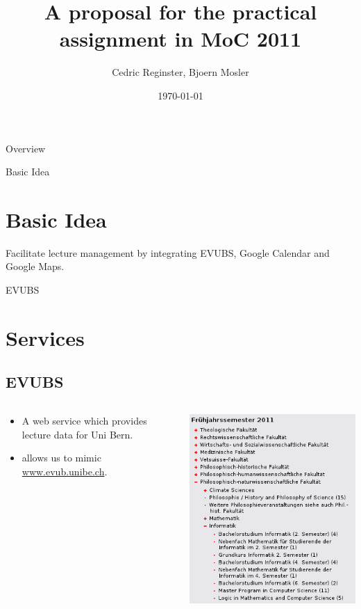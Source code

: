 \documentclass{beamer}
\title[Integrated Lecture Management]{A proposal for the practical assignment in MoC 2011}
\date{\today}
\institute{IAM}
\author{Cedric Reginster, Bjoern Mosler}
\begin{document}
\begin{frame}
	\titlepage
\end{frame}


\begin{frame}{Overview}
	\tableofcontents
\end{frame}

\begin{frame}{Basic Idea}

	\section{Basic Idea}
	Facilitate lecture management by integrating EVUBS, Google Calendar and Google Maps.

\end{frame}

\begin{frame}{EVUBS}

	\section{Services}
	\subsection{EVUBS}

	\begin{columns}
		\begin{column}{0.5\textwidth}
			\begin{itemize}
				\item A web service which provides lecture data for Uni Bern.
				\item allows us to mimic \url{www.evub.unibe.ch}.
			\end{itemize}
		\end{column}

		\begin{column}{0.5\textwidth}
			\includegraphics[scale=0.5]{evub.png} 
		\end{column}
	\end{columns}

\end{frame}
\end{document}
